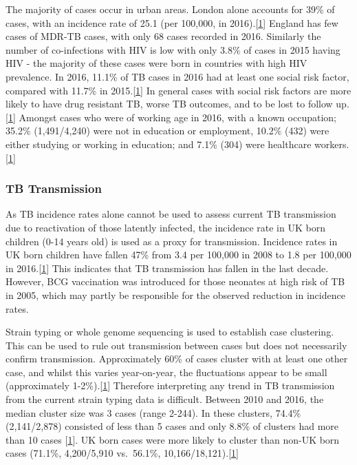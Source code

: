 \documentclass[11pt,twoside]{bristolthesis}
\begin{document}
  The majority of cases occur in urban areas. London alone accounts for 39\% of cases, with an incidence rate of 25.1 (per 100,000, in 2016).{[}\protect\hyperlink{ref-PHE2017}{1}{]} England has few cases of MDR-TB cases, with only 68 cases recorded in 2016. Similarly the number of co-infections with HIV is low with only 3.8\% of cases in 2015 having HIV - the majority of these cases were born in countries with high HIV prevalence. In 2016, 11.1\% of TB cases in 2016 had at least one social risk factor, compared with 11.7\% in 2015.{[}\protect\hyperlink{ref-PHE2017}{1}{]} In general cases with social risk factors are more likely to have drug resistant TB, worse TB outcomes, and to be lost to follow up. {[}\protect\hyperlink{ref-PHE2017}{1}{]} Amongst cases who were of working age in 2016, with a known occupation; 35.2\% (1,491/4,240) were not in education or employment, 10.2\% (432) were either studying or working in education; and 7.1\% (304) were healthcare workers.{[}\protect\hyperlink{ref-PHE2017}{1}{]}
  
  \hypertarget{tb-transmission}{%
  \subsubsection{TB Transmission}\label{tb-transmission}}
  
  As TB incidence rates alone cannot be used to assess current TB transmission due to reactivation of those latently infected, the incidence rate in UK born children (0-14 years old) is used as a proxy for transmission. Incidence rates in UK born children have fallen 47\% from 3.4 per 100,000 in 2008 to 1.8 per 100,000 in 2016.{[}\protect\hyperlink{ref-PHE2017}{1}{]} This indicates that TB transmission has fallen in the last decade. However, BCG vaccination was introduced for those neonates at high risk of TB in 2005, which may partly be responsible for the observed reduction in incidence rates.
  
  Strain typing or whole genome sequencing is used to establish case clustering. This can be used to rule out transmission between cases but does not necessarily confirm transmission. Approximately 60\% of cases cluster with at least one other case, and whilst this varies year-on-year, the fluctuations appear to be small (approximately 1-2\%).{[}\protect\hyperlink{ref-PHE2017}{1}{]} Therefore interpreting any trend in TB transmission from the current strain typing data is difficult. Between 2010 and 2016, the median cluster size was 3 cases (range 2-244). In these clusters, 74.4\% (2,141/2,878) consisted of less than 5 cases and only 8.8\% of clusters had more than 10 cases {[}\protect\hyperlink{ref-PHE2017}{1}{]}. UK born cases were more likely to cluster than non-UK born cases (71.1\%, 4,200/5,910 vs.~56.1\%, 10,166/18,121).{[}\protect\hyperlink{ref-PHE2017}{1}{]}
  
\end{document}
